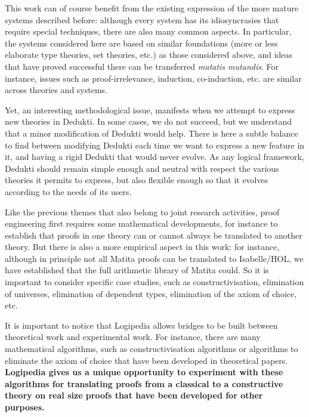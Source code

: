This work can of course benefit from the existing expression of the
more mature systems described before: although every system has its
idiosyncrasies that require special techniques, there are also many
common aspects. In particular, the systems considered here are based
on similar foundations (more or less elaborate type theories, set
theories, etc.) as those considered above, and ideas that have proved
successful there can be transferred {\em mutatis mutandis}. For
instance, issues such as proof-irrelevance, induction, co-induction,
etc. are similar across theories and systems.

Yet, an interesting methodological issue, manifests when we attempt to
express new theories in Dedukti. In some cases, we do not succeed, but
we understand that a minor modification of Dedukti would help. There
is here a subtle balance to find between modifying Dedukti each time
we want to express a new feature in it, and having a rigid Dedukti
that would never evolve. As any logical framework, Dedukti should
remain simple enough and neutral with respect the various theories
it permits to express, but also flexible enough so that it evolves
according to the needs of its users.


Like the previous themes that also belong to joint research
activities, proof engineering first requires some mathematical
developments, for instance to establish that proofs in one theory can
or cannot always be translated to another theory. But there is also a
more empirical aspect in this work: for instance, although in
principle not all Matita proofs can be translated to Isabelle/HOL, we
have established that the full arithmetic library of Matita could. So
it is important to consider specific case studies, such as
constructivisation, elimination of universes, elimination of dependent
types, elimination of the axiom of choice, etc.

It is important to notice that Logipedia allows bridges to be built
between theoretical work and experimental work. For instance, there
are many mathematical algorithms, such as constructivisation
algorithms or algorithms to eliminate the axiom of choice that have
been developed in theoretical papers. {\bf Logipedia gives us a unique
opportunity to experiment with these algorithms for translating proofs
from a classical to a constructive theory on real size proofs that
have been developed for other purposes.}

